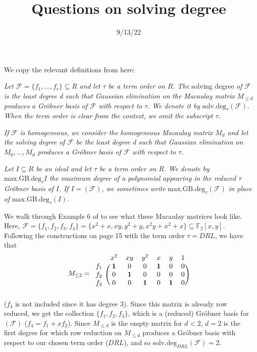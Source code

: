 \documentclass[12pt]{article}
\title{Questions on solving degree}
\date{9/13/22}
\newenvironment{definition}[2][Definition]{\begin{trivlist}
\item[\hskip \labelsep {\bfseries #1}\hskip \labelsep {\bfseries #2.}]}{\end{trivlist}}
\newcommand{\F}{\mathcal{F}}
\newcommand{\sdeg}{\text{solv.deg}}
\newcommand{\mdeg}{\text{max.GB.deg}}
\begin{document}
\maketitle

\noindent We copy the relevant definitions from \cite{caminata2020solving} here:

\begin{definition}{6 (page 15)}
	\emph{Let $\mathcal{F} = \{f_1, \dots, f_r\} \subseteq R$ and let $\tau$ be a term order on $R$. The} solving degree \emph{of $\mathcal{F}$ is the least degree d such that Gaussian elimination on the Macaulay matrix $M_{\leq d}$ produces a Gr\"obner basis of $\mathcal{F}$ with respect to $\tau$. We denote it by} $\sdeg_\tau(\mathcal{F})$. \emph{When the term order is clear from the context, we omit the subscript $\tau$.}

	\emph{If $\mathcal{F}$ is homogeneous, we consider the homogeneous Macaulay matrix $M_d$ and let the solving degree of $\mathcal{F}$ be the least degree d such that Gaussian elimination on $M_0, \dots, M_d$ produces a Gr\"obner basis of $\mathcal{F}$ with respect to $\tau$.}
\end{definition}


\begin{definition}{7 (page 16)}
	\emph{Let $I \subseteq R$ be an ideal and let $\tau$ be a term order on $R$. We denote by} $\mdeg_\tau{I}$ \emph{the maximum degree of a polynomial appearing in the reduced $\tau$ Gr\"obner basis of $I$. If $I = (\mathcal{F})$, we sometimes write} $\mdeg_\tau(\mathcal{F})$ \emph{in place of} $\mdeg_\tau(I)$.
\end{definition}


\noindent We walk through Example 6 of \cite{caminata2020solving} to see what these Macaulay matrices look like. Here, $\mathcal{F} = \{f_1, f_2, f_3, f_4\} = \{x^2 + x, xy, y^2 + y, x^2y + x^2 + x\} \subseteq \mathbb{F}_2[x,y]$. Following the constructions on page 15 with the term order $\tau = DRL$, we have that \[ M_{\leq 2} = \begin{blockarray}{ccccccc}
    & x^2 & xy & y^2 & x & y & 1 \\
    \begin{block}{c(cccccc)}
        f_1 & \mathbf{1} & 0 & 0 & \mathbf{1} & 0 & 0 \\
        f_2 & 0 & \mathbf{1} & 0 & 0 & 0 & 0 \\
        f_3 & 0 & 0 & \mathbf{1} & 0 & \mathbf{1} & 0 \\
    \end{block}
\end{blockarray} \] ($f_4$ is not included since it has degree 3). Since this matrix is already row reduced, we get the collection $\{f_1, f_2, f_3\}$, which is a (reduced) Gr\"obner basis for $(\F)$ ($f_4 = f_1 + xf_2$). Since $M_{\leq d}$ is the empty matrix for $d < 2$, $d = 2$ is the first degree for which row reduction on $M_{\leq d}$ produces a Gr\"obner basis with respect to our chosen term order ($DRL$), and so $\sdeg_{DRL}(\F) = 2$.  \\
\end{document}

